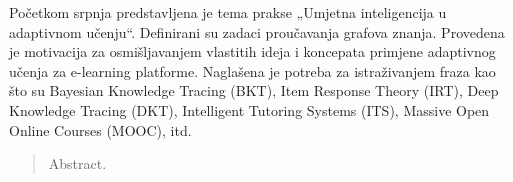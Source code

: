 \documentclass[times, utf8,projekt]{fer}
\begin{document}
\begin{sazetak}
Početkom srpnja predstavljena je tema prakse „Umjetna inteligencija u adaptivnom učenju“. Definirani su zadaci proučavanja grafova znanja. Provedena je motivacija za osmišljavanjem vlastitih ideja i koncepata primjene adaptivnog učenja za e-learning platforme. Naglašena je potreba za istraživanjem fraza kao što su Bayesian Knowledge Tracing (BKT), Item Response Theory (IRT), Deep Knowledge Tracing (DKT), Intelligent Tutoring Systems (ITS), Massive Open Online Courses (MOOC), itd.

\end{sazetak}

\begin{abstract}
Abstract.

\end{abstract}
\end{document}
